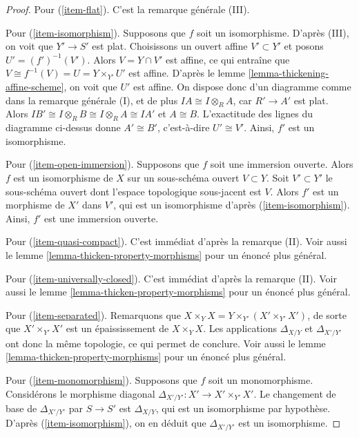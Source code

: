 \begin{proof}
\medskip\noindent
Pour (\ref{item-flat}). C'est la remarque générale (III).

\medskip\noindent
Pour (\ref{item-isomorphism}). Supposons que $f$ soit un isomorphisme.
D'après (III), on voit que $Y' \to S'$ est plat. Choisissons un
ouvert affine $V' \subset Y'$ et posons $U' = (f')^{-1}(V')$. Alors
$V = Y \cap V'$ est affine, ce qui entraîne que
$V \cong f^{-1}(V) = U = Y \times_{Y'} U'$ est affine. D'après
le lemme \ref{lemma-thickening-affine-scheme},
on voit que $U'$ est affine. On dispose donc d'un diagramme comme dans
la remarque générale (I), et de plus $IA \cong I \otimes_R A$, car
$R' \to A'$ est plat. Alors
$IB' \cong I \otimes_R B \cong I \otimes_R A \cong IA'$
et $A \cong B$. L'exactitude des lignes
du diagramme ci-dessus donne $A' \cong B'$,
c'est-à-dire $U' \cong V'$. Ainsi, $f'$ est un isomorphisme.

\medskip\noindent
Pour (\ref{item-open-immersion}). Supposons que $f$ soit une immersion ouverte.
Alors $f$ est un isomorphisme de $X$ sur un sous-schéma ouvert $V \subset Y$.
Soit $V' \subset Y'$ le sous-schéma ouvert dont l'espace topologique
sous-jacent est $V$. Alors $f'$ est un morphisme de $X'$ dans $V'$, qui est un isomorphisme d'après
(\ref{item-isomorphism}). Ainsi, $f'$ est une immersion ouverte.

\medskip\noindent
Pour (\ref{item-quasi-compact}). C'est immédiat d'après la remarque (II). Voir aussi
le lemme \ref{lemma-thicken-property-morphisms} pour un énoncé plus général.

\medskip\noindent
Pour (\ref{item-universally-closed}). C'est immédiat d'après la remarque (II). Voir aussi
le lemme \ref{lemma-thicken-property-morphisms} pour un énoncé plus général.

\medskip\noindent
Pour (\ref{item-separated}). Remarquons que
$X \times_Y X = Y \times_{Y'} (X' \times_{Y'} X')$, de sorte que
$X' \times_{Y'} X'$ est un épaississement de $X \times_Y X$.
Les applications $\Delta_{X/Y}$ et $\Delta_{X'/Y'}$ ont donc la même
topologie, ce qui permet de conclure. Voir aussi
le lemme \ref{lemma-thicken-property-morphisms} pour un énoncé plus général.

\medskip\noindent
Pour (\ref{item-monomorphism}). Supposons que $f$ soit un monomorphisme.
Considérons le morphisme diagonal $\Delta_{X'/Y'} : X' \to X' \times_{Y'} X'$.
Le changement de base de $\Delta_{X'/Y'}$ par $S \to S'$ est $\Delta_{X/Y}$,
qui est un isomorphisme par hypothèse. D'après (\ref{item-isomorphism}),
on en déduit que $\Delta_{X'/Y'}$ est un isomorphisme.


\end{proof}

